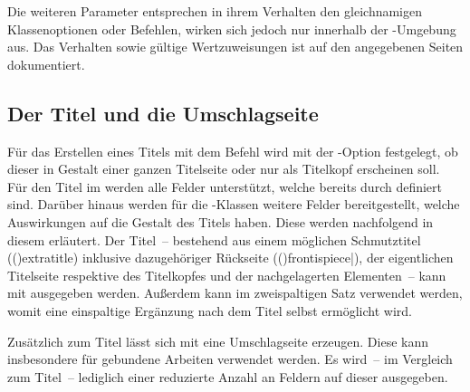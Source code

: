 \begin{DeclareEntity*}{}
\begin{DeclareEntity*}{}
\begin{DeclareEntity*}{}
\begin{Declaration}
\begin{Declaration}
\begin{Declaration}
\begin{Declaration}
\begin{Declaration}
\begin{Declaration}
\begin{Declaration}
\begin{Declaration}
\begin{Declaration}
\begin{Declaration}
\begin{Declaration}
\begin{Declaration}
Die weiteren Parameter entsprechen in ihrem Verhalten den gleichnamigen 
Klassenoptionen oder Befehlen, wirken sich jedoch nur innerhalb der 
-Umgebung aus. Das Verhalten sowie gültige 
Wertzuweisungen ist auf den angegebenen Seiten dokumentiert.
\end{Declaration}
\end{Declaration}
\end{Declaration}
\end{Declaration}
\end{Declaration}
\end{Declaration}
\end{Declaration}
\end{Declaration}
\end{Declaration}
\end{Declaration}
\end{Declaration}
\end{Declaration}
%



\subsection{%
  Der Titel und die Umschlagseite%
  \label{sec:title}%
}

%
Für das Erstellen eines Titels mit dem Befehl  wird mit der 
\KOMAScript-Option 
festgelegt, ob dieser in Gestalt einer ganzen Titelseite oder nur als Titelkopf 
erscheinen soll. Für den Titel im \TUDCD werden alle Felder unterstützt, welche 
bereits durch \KOMAScript definiert sind. Darüber hinaus werden für die 
\TUDScript-Klassen weitere Felder bereitgestellt, welche Auswirkungen auf die 
Gestalt des Titels haben. Diese werden nachfolgend in diesem \autorefname 
erläutert. Der Titel~-- bestehend aus einem möglichen Schmutztitel 
(\Macro(){extratitle}) inklusive dazugehöriger Rückseite 
(\Macro(){frontispiece|}), der 
eigentlichen Titelseite respektive des Titelkopfes und der nachgelagerten 
Elementen~-- kann mit  ausgegeben werden. Außerdem kann im 
zweispaltigen Satz  verwendet werden, womit eine 
einspaltige Ergänzung nach dem Titel selbst ermöglicht wird.

Zusätzlich zum Titel lässt sich mit  eine Umschlagseite 
erzeugen. Diese kann insbesondere für gebundene Arbeiten verwendet werden. Es 
wird~-- im Vergleich zum Titel~-- lediglich einer reduzierte Anzahl an Feldern 
auf dieser ausgegeben.


\end{DeclareEntity*}
\end{DeclareEntity*}
\end{DeclareEntity*}
